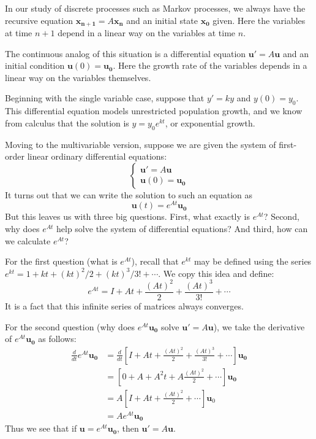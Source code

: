 \documentclass[11pt,oneside]{amsbook}
\theoremstyle{definition}
\theoremstyle{plain}
\theoremstyle{definition}
\theoremstyle{remark}
\numberwithin{equation}{section}
\numberwithin{figure}{section}
\begin{document}
In our study of discrete processes such as Markov processes, we always have the recursive equation $\mathbf{x_{n+1}}=A\mathbf{x_n}$ and an initial state $\mathbf{x_0}$ given. Here the variables at time $n+1$ depend in a linear way on the variables at time $n$.

The continuous analog of this situation is a differential equation $\mathbf{u}'=A\mathbf{u}$ and an initial condition $\mathbf{u}(0)=\mathbf{u_0}$. Here the growth rate of the variables depends in a linear way on the variables themselves.

Beginning with the single variable case, suppose that $y'=ky$ and $y(0)=y_0$. This differential equation models unrestricted population growth, and we know from calculus that the solution is $y=y_0e^{kt}$, or exponential growth.

Moving to the multivariable version, suppose we are given the system of first-order linear ordinary differential equations:
\[\begin{cases}
    \mathbf{u}'=A\mathbf{u}\\
    \mathbf{u}(0)=\mathbf{u_0}
  \end{cases}
\]
It turns out that we can write the solution to such an equation as
\[\mathbf{u}(t)=e^{At}\mathbf{u_0}
\]
But this leaves us with three big questions. First, what exactly is $e^{At}$? Second, why does $e^{At}$ help solve the system of differential equations? And third, how can we calculate $e^{At}$?

For the first question (what is $e^{At}$), recall that $e^{kt}$ may be defined using the series $e^{kt}=1+kt+(kt)^2/2+(kt)^3/3!+\cdots$. We copy this idea and define:
\[e^{At}=I+At+\frac{(At)^2}{2}+\frac{(At)^3}{3!}+\cdots
\]
It is a fact that this infinite series of matrices always converges.

For the second question (why does $e^{At}\mathbf{u_0}$ solve $\mathbf{u}'=A\mathbf{u}$), we take the derivative of $e^{At}\mathbf{u_0}$ as follows:
\begin{align*}
  \frac{d}{dt}e^{At}\mathbf{u_0}
  &=\frac{d}{dt}\left[
    I+At+\frac{(At)^2}{2}+\frac{(At)^3}{3!}+\cdots
    \right]\mathbf{u_0}\\
  &=\left[0+A+A^2t+A\frac{(At)^2}{2}+\cdots\right]
    \mathbf{u_0}\\
  &=A\left[I+At+\frac{(At)^2}{2}+\cdots\right]\mathbf{u}_0\\
  &=Ae^{At}\mathbf{u_0}
\end{align*}
Thus we see that if $\mathbf{u}=e^{At}\mathbf{u_0}$, then $\mathbf{u}'=A\mathbf{u}$.
\end{document}
